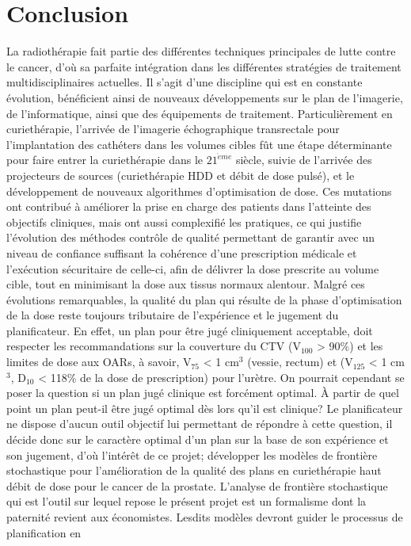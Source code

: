 \chapter{Conclusion}         %
% 
% 
\lettrine[nindent=0em,lines=2]{L}{}a radiothérapie fait partie des différentes techniques principales de lutte contre le cancer, d’où sa parfaite intégration dans les différentes stratégies de traitement multidisciplinaires actuelles. Il s’agit d’une discipline qui est en constante évolution, bénéficient ainsi de nouveaux développements sur le plan de l’imagerie, de l’informatique, ainsi que des équipements de traitement. Particulièrement en curiethérapie, l’arrivée de l’imagerie échographique transrectale pour l’implantation des cathéters dans les volumes cibles fût une étape déterminante pour faire entrer la curiethérapie dans le $21^{\grave{e}me}$ siècle, suivie de l’arrivée des projecteurs de sources (curiethérapie HDD et débit de dose pulsé), et le développement de nouveaux algorithmes d’optimisation de dose. Ces mutations ont contribué à améliorer la prise en charge des patients dans l’atteinte des objectifs cliniques, mais ont aussi complexifié les pratiques, ce qui justifie l’évolution des méthodes contrôle de qualité permettant de garantir avec un niveau de confiance suffisant la cohérence d’une prescription médicale et l’exécution sécuritaire de celle-ci, afin de délivrer la dose prescrite au volume cible, tout en minimisant la dose aux tissus normaux alentour. Malgré ces évolutions remarquables, la qualité du plan qui résulte de la phase d’optimisation de la dose reste toujours tributaire de l’expérience et le jugement du planificateur. En effet, un plan pour être jugé cliniquement acceptable, doit respecter les recommandations sur la couverture du CTV (V$_{100}$ > 90\%) et les limites de dose aux OARs, à savoir, V$_{75}$ < 1 cm$^{3}$ (vessie, rectum) et (V$_{125}$ < 1 cm$^{3}$, D$_{10}$ < 118\% de la dose de prescription) pour l’urètre. On pourrait cependant se poser la question si un plan jugé clinique est forcément optimal. À partir de quel point un plan peut-il être jugé optimal dès lors qu’il est clinique? Le planificateur ne dispose d’aucun outil objectif lui permettant de répondre à cette question, il décide donc sur le caractère optimal d’un plan sur la base de son expérience et son jugement, d’où l’intérêt de ce projet; développer les modèles de frontière stochastique pour l’amélioration de la qualité des plans en curiethérapie haut débit de dose pour le cancer de la prostate. L’analyse de frontière stochastique qui est l’outil sur lequel repose le présent projet est un formalisme dont la paternité revient aux économistes. Lesdits modèles devront guider le processus de planification en 